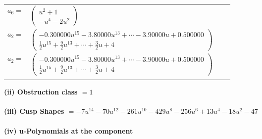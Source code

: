 \documentclass[1p]{elsarticle_modified}
\theoremstyle{definition}
\begin{document}
\begin{tabular}{m{7pt} m{180pt} m{7pt} m{180pt} }
\flushright $a_{6}=$&$\begin{pmatrix}u^2+1\\- u^4-2 u^2\end{pmatrix}$ \\
\flushright $a_{2}=$&$\begin{pmatrix}-0.300000 u^{15}-3.80000 u^{13}+\cdots-3.90000 u+0.500000\\\frac{1}{2} u^{15}+\frac{9}{2} u^{13}+\cdots+\frac{3}{2} u+4\end{pmatrix}$\\ \flushright $a_{2}=$&$\begin{pmatrix}-0.300000 u^{15}-3.80000 u^{13}+\cdots-3.90000 u+0.500000\\\frac{1}{2} u^{15}+\frac{9}{2} u^{13}+\cdots+\frac{3}{2} u+4\end{pmatrix}$\\&\end{tabular}
\flushleft \textbf{(ii) Obstruction class $= 1$}\\~\\
\flushleft \textbf{(iii) Cusp Shapes $= -7 u^{14}-70 u^{12}-261 u^{10}-429 u^8-256 u^6+13 u^4-18 u^2-47$}\\~\\
\newpage\renewcommand{\arraystretch}{1}
\flushleft \textbf{(iv) u-Polynomials at the component}\newline \\
\end{document}
